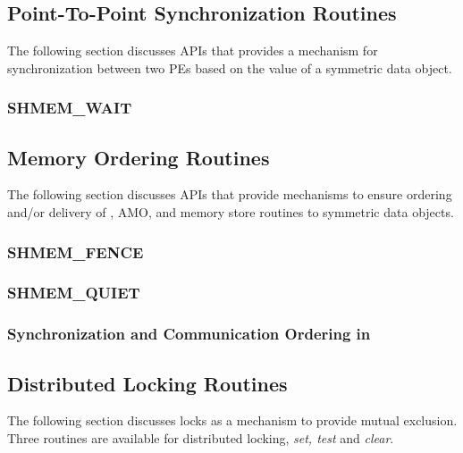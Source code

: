 \documentclass[10pt]{book}
\begin{document}
\subsection{Point-To-Point Synchronization Routines}
The following section discusses \openshmem \ac{API}s that provides a mechanism
for synchronization between two \ac{PE}s based on the value of a symmetric data
object. 

\subsubsection{\textbf{SHMEM\_WAIT}}\label{subsec:shmem_wait}






\subsection{Memory Ordering Routines}\label{subsec:memory_order}
The following section discusses \openshmem \ac{API}s that provide mechanisms to
ensure ordering and/or delivery of , \ac{AMO}, and memory store
routines to symmetric data objects. 

\subsubsection{\textbf{SHMEM\_FENCE}}\label{subsec:shmem_fence}


\subsubsection{\textbf{SHMEM\_QUIET}}\label{subsec:shmem_quiet}


\subsubsection{Synchronization and Communication Ordering in \openshmem}







\subsection{Distributed Locking Routines}
The following section discusses \openshmem locks as a mechanism to provide
mutual exclusion. Three routines are available for distributed locking,
\textit{set, test} and \textit{clear}.
\end{document}
